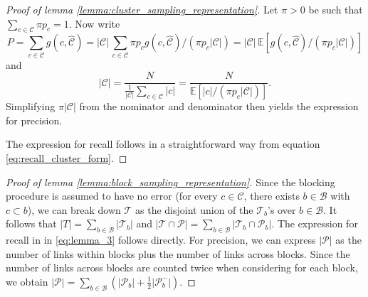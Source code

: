 \documentclass[fontsize=11pt]{article}
\theoremstyle{definition}
\begin{document}
\begin{proof}[Proof of lemma \ref{lemma:cluster_sampling_representation}]
Let $\pi > 0$ be such that $\sum_{c \in \mathcal{C}} \pi p_c= 1$. Now write
\begin{equation}
    P = \sum_{c \in \mathcal{C}} g(c, \widehat{\mathcal{C}}) = \lvert \mathcal{C} \rvert\, \sum _{c \in \mathcal{C}} \pi p_c g(c, \widehat{\mathcal{C}}) / (\pi p_c \lvert \mathcal{C} \rvert)  =  \lvert \mathcal{C}\rvert\, \mathbb{E}\left[ g(c, \widehat{\mathcal{C}})/(\pi p_c \lvert \mathcal{C} \rvert) \right]
\end{equation}
and 
\begin{equation}
    \lvert \mathcal{C} \rvert = \frac{N}{\frac{1}{\lvert \mathcal{C} \rvert} \sum_{c \in \mathcal{C}} \lvert c \rvert} = \frac{N}{\mathbb{E}[\lvert c \rvert / (\pi p_c \lvert \mathcal{C} \rvert)]}.
\end{equation}
Simplifying $\pi \lvert \mathcal{C} \rvert$ from the nominator and denominator then yields the expression for precision.

The expression for recall follows in a straightforward way from equation \eqref{eq:recall_cluster_form}.
\end{proof}

\begin{proof}[Proof of lemma \ref{lemma:block_sampling_representation}]
Since the blocking procedure is assumed to have no error (for every $ c \in \mathcal{C}$, there exists $b \in \mathcal{B}$ with $c \subset b$), we can break down $\mathcal{T}$ as the disjoint union of the $\mathcal{T}_b$'s over $b \in \mathcal{B}$. It follows that $\lvert T \rvert = \sum_{b \in \mathcal{B}} \lvert \mathcal{T}_b \rvert$ and  $\lvert \mathcal{T} \cap \mathcal{P} \rvert = \sum_{b \in \mathcal{B}} \lvert \mathcal{T}_b \cap \mathcal{P}_b \rvert$. The expression for recall in in \eqref{eq:lemma_3} follows directly. For precision, we can express $\lvert \mathcal{P} \rvert$ as the number of links within blocks plus the number of links across blocks. Since the number of links across blocks are counted twice when considering for each block, we obtain $\lvert \mathcal{P} \rvert = \sum_{b \in \mathcal{B}} \left( \lvert \mathcal{P}_b \rvert + \tfrac{1}{2} \lvert \mathcal{P}_b^{-} \rvert \right)$. 
\end{proof}
\end{document}
